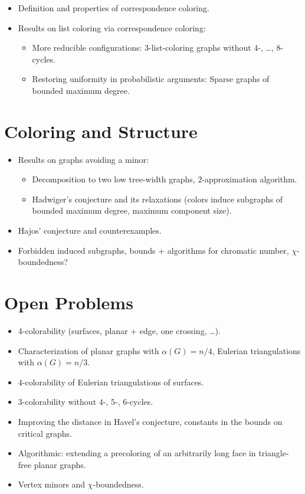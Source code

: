 \documentclass[12pt,twoside,openright,a4paper]{book}
\begin{document}
\begin{itemize}
\item Definition and properties of correspondence coloring.
\item Results on list coloring via correspondence coloring:
\begin{itemize}
\item More reducible configurations: $3$-list-coloring graphs without $4$-, \ldots, $8$-cycles.
\item Restoring uniformity in probabilistic arguments: Sparse graphs of bounded maximum degree.
\end{itemize}
\end{itemize}

\chapter{Coloring and Structure}
% 

\begin{itemize}
\item Results on graphs avoiding a minor:
\begin{itemize}
\item Decomposition to two low tree-width graphs, $2$-approximation algorithm.
\item Hadwiger's conjecture and its relaxations (colors induce subgraphs of bounded maximum degree, maximum component size).
\end{itemize}
\item Hajos' conjecture and counterexamples.
\item Forbidden induced subgraphs, bounds + algorithms for chromatic number, $\chi$-boundedness?
\end{itemize}

\chapter{Open Problems}
% 

\begin{itemize}
\item 4-colorability (surfaces, planar + edge, one crossing, \ldots).
\item Characterization of planar graphs with $\alpha(G)=n/4$, Eulerian triangulations with $\alpha(G)=n/3$.
\item $4$-colorability of Eulerian triangulations of surfaces.
\item $3$-colorability without $4$-, $5$-, $6$-cycles.
\item Improving the distance in Havel's conjecture, constants in the bounds on critical graphs.
\item Algorithmic: extending a precoloring of an arbitrarily long face in triangle-free planar graphs.
\item Vertex minors and $\chi$-boundedness.
\end{itemize}

\newpage
\pagestyle{plain}
\printindex



\end{document}
